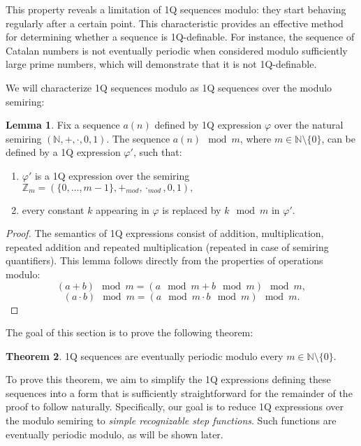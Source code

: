 \documentclass[en]{pracamgr}
\theoremstyle{definition}
\newtheorem{theorem}{Theorem}[section]
\newtheorem{lemma}[theorem]{Lemma}
\begin{document}
This property reveals a limitation of 1Q sequences modulo: they start behaving regularly after a certain point. This characteristic provides an effective method for determining whether a sequence is 1Q-definable. For instance, the sequence of Catalan numbers is not eventually periodic when considered modulo sufficiently large prime numbers, which will demonstrate that it is not 1Q-definable.

We will characterize 1Q sequences modulo as 1Q sequences over the modulo semiring:

\begin{lemma}
    \label{1QModulo}
    Fix a sequence $a(n)$ defined by 1Q expression $\varphi$ over the natural semiring $(\mathbb{N}, +, \cdot, 0, 1)$. The sequence $a(n) \mod m$, where $m \in \mathbb{N} \setminus \{0\}$, can be defined by a 1Q expression $\varphi'$, such that:
    \begin{enumerate}
        \item $\varphi'$ is a 1Q expression over the semiring $\mathbb{Z}_m = (\{0,\ldots,m-1\}, +_{mod}, \cdot_{mod}, 0, 1),$
        \item every constant $k$ appearing in $\varphi$ is replaced by $k \mod m$ in $\varphi'.$
    \end{enumerate}
\end{lemma}

\begin{proof}
    The semantics of 1Q expressions consist of addition, multiplication, repeated addition and repeated multiplication (repeated in case of semiring quantifiers). This lemma follows directly from the properties of operations modulo:
    $$(a + b) \mod m = (a \mod m + b \mod m) \mod m,$$
    $$(a \cdot b) \mod m = (a \mod m \cdot b \mod m) \mod m.$$
\end{proof}

The goal of this section is to prove the following theorem:

\begin{theorem}
    \label{1QSequencesPeriodic}
    1Q sequences are eventually periodic modulo every $m \in \mathbb{N} \setminus \{0\}$.
\end{theorem}

To prove this theorem, we aim to simplify the 1Q expressions defining these sequences into a form that is sufficiently straightforward for the remainder of the proof to follow naturally. Specifically, our goal is to reduce 1Q expressions over the modulo semiring to \emph{simple recognizable step functions}. Such functions are eventually periodic modulo, as will be shown later.
\end{document}
